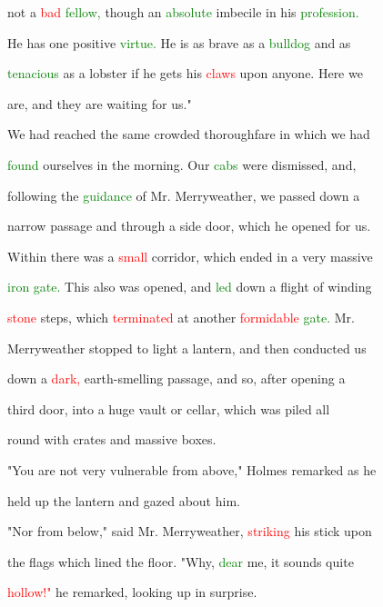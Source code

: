  not a \textcolor{red}{bad} \textcolor{green}{fellow,} though an \textcolor{green}{absolute} imbecile in his \textcolor{green}{profession.}

 He has one positive \textcolor{green}{virtue.} He is as brave as a \textcolor{green}{bulldog} and as

 \textcolor{green}{tenacious} as a lobster if he gets his \textcolor{red}{claws} upon anyone. Here we

 are, and they are \textcolor{BurntOrange}{waiting} for us."



 We had reached the same crowded thoroughfare in which we had

 \textcolor{green}{found} ourselves in the morning. Our \textcolor{green}{cabs} were dismissed, and,

 following the \textcolor{green}{guidance} of Mr. Merryweather, we passed down a

 narrow passage and through a side door, which he opened for us.

 Within there was a \textcolor{red}{small} corridor, which ended in a very massive

 \textcolor{green}{iron} \textcolor{green}{gate.} This also was opened, and \textcolor{green}{led} down a flight of winding

 \textcolor{red}{stone} steps, which \textcolor{red}{terminated} at another \textcolor{red}{formidable} \textcolor{green}{gate.} Mr.

 Merryweather stopped to light a lantern, and then conducted us

 down a \textcolor{red}{dark,} earth-smelling passage, and so, after opening a

 third door, into a huge vault or cellar, which was piled all

 round with crates and massive boxes.



 "You are not very vulnerable from above," Holmes remarked as he

 held up the lantern and gazed about him.



 "Nor from below," said Mr. Merryweather, \textcolor{red}{striking} his stick upon

 the flags which lined the floor. "Why, \textcolor{green}{dear} me, it sounds quite

 \textcolor{red}{hollow!"} he remarked, looking up in \textcolor{BurntOrange}{surprise.}



